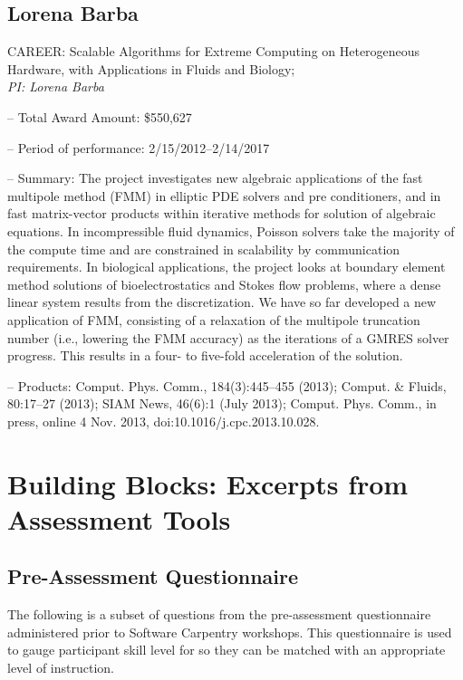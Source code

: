 \documentclass{proposalnsf}
\begin{document}
\subsection{Lorena Barba}


CAREER:  Scalable Algorithms for Extreme Computing on Heterogeneous  Hardware, with Applications in Fluids and Biology;\\  {\it PI: Lorena Barba}
\begin{compactitem}
\item[--] Total Award Amount: \$550,627
\item[--] Period of performance: 2/15/2012--2/14/2017
\item[--] Summary: The project investigates new algebraic applications of the fast multipole method (FMM) in elliptic PDE solvers and pre conditioners, and in fast matrix-vector products within iterative methods for solution of algebraic equations. In incompressible fluid dynamics, Poisson solvers take the majority of the compute time and are constrained in scalability by communication requirements. In biological applications, the project looks at boundary element method solutions of bioelectrostatics and Stokes flow problems, where a dense linear system results from the discretization. We have so far developed a new application of FMM, consisting of a relaxation of the multipole truncation number (i.e., lowering the FMM accuracy) as the iterations of a GMRES solver progress. This results in a four- to five-fold acceleration of the solution.
\item[--] Products: Comput. Phys. Comm., 184(3):445--455 (2013); Comput. \& Fluids, 80:17--27 (2013); SIAM News, 46(6):1 (July 2013); Comput. Phys. Comm., in press, online 4 Nov. 2013, doi:10.1016/j.cpc.2013.10.028.
\end{compactitem}

\section{Building Blocks: Excerpts from Assessment Tools}

\subsection{Pre-Assessment Questionnaire}
\label{sec:questionnaire}

The following is a subset of questions from the pre-assessment
questionnaire administered prior to Software Carpentry workshops. 
This questionnaire is used  to gauge participant skill level for so they can be
matched with an appropriate level of instruction.
\end{document}
